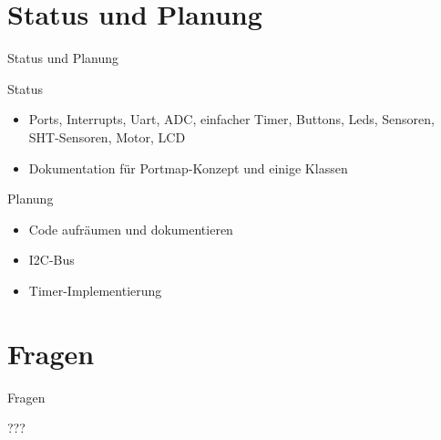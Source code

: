 \documentclass[11pt]{beamer}
\begin{document}
\section{Status und Planung}
\begin{frame}[fragile]{Status und Planung}

\begin{block}{Status}
\begin{itemize}
	\item Ports, Interrupts, Uart, ADC, einfacher Timer, Buttons, Leds, Sensoren, SHT-Sensoren, Motor, LCD
	\item Dokumentation für Portmap-Konzept und einige Klassen
\end{itemize}
\end{block}

\begin{block}{Planung}
 \begin{itemize}
	\item Code aufräumen und dokumentieren
	\item I2C-Bus
	\item Timer-Implementierung
\end{itemize}
\end{block}

\end{frame}


\section*{Fragen}
\begin{frame}[fragile]{Fragen}
\begin{center}
\begin{Huge}\begin{Huge}???\end{Huge}\end{Huge}\end{center}
\end{frame}
\end{document}
